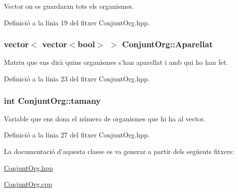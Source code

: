 Vector on es guardaran tots els organismes. 



Definició a la línia 19 del fitxer Conjunt\-Org.\-hpp.

\hypertarget{class_conjunt_org_a9782fdb4c89e8dd61762453de8f77fcb}{
\subsubsection[{Aparellat}]{\setlength{\rightskip}{0pt plus 5cm}vector$<$ vector$<$bool$>$ $>$ Conjunt\-Org\-::\-Aparellat\hspace{0.3cm}{\ttfamily [private]}}}\label{class_conjunt_org_a9782fdb4c89e8dd61762453de8f77fcb}


Matriu que ens dirà quins organismes s'han aparellat i amb qui ho han fet. 



Definició a la línia 23 del fitxer Conjunt\-Org.\-hpp.

\hypertarget{class_conjunt_org_a468e7686498561628ad731ea196df8b5}{
\subsubsection[{tamany}]{\setlength{\rightskip}{0pt plus 5cm}int Conjunt\-Org\-::tamany\hspace{0.3cm}{\ttfamily [private]}}}\label{class_conjunt_org_a468e7686498561628ad731ea196df8b5}


Variable que ens dona el número de organismes que hi ha al vector. 



Definició a la línia 27 del fitxer Conjunt\-Org.\-hpp.



La documentació d'aquesta classe es va generar a partir dels següents fitxers\-:\begin{DoxyCompactItemize}
\item 
\hyperlink{_conjunt_org_8hpp}{Conjunt\-Org.\-hpp}\item 
\hyperlink{_conjunt_org_8cpp}{Conjunt\-Org.\-cpp}\end{DoxyCompactItemize}
